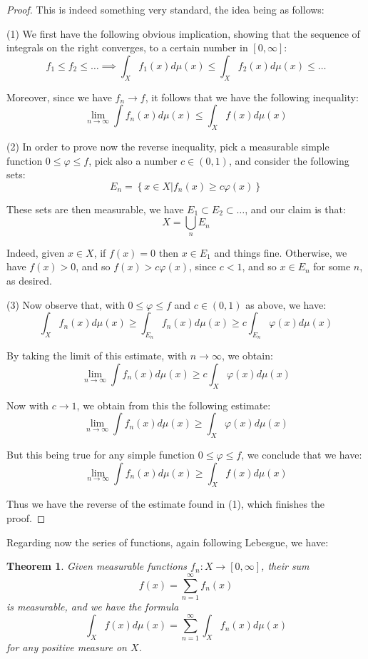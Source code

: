 \documentclass[12pt]{amsbook}
\newtheorem{theorem}{Theorem}[chapter]
\begin{document}
\begin{proof}
This is indeed something very standard, the idea being as follows:

\medskip

(1) We first have the following obvious implication, showing that the sequence of integrals on the right converges, to a certain number in $[0,\infty]$: 
$$f_1\leq f_2\leq\ldots\implies\int_Xf_1(x)d\mu(x)\leq\int_Xf_2(x)d\mu(x)\leq\ldots$$

Moreover, since we have $f_n\to f$, it follows that we have the following inequality:
$$\lim_{n\to\infty}\int f_n(x)d\mu(x)\leq\int_Xf(x)d\mu(x)$$

(2) In order to prove now the reverse inequality, pick a measurable simple function $0\leq\varphi\leq f$, pick also a number $c\in(0,1)$, and consider the following sets:
$$E_n=\left\{x\in X\Big|f_n(x)\geq c\varphi(x)\right\}$$

These sets are then measurable, we have $E_1\subset E_2\subset\ldots$, and our claim is that:
$$X=\bigcup_nE_n$$

Indeed, given $x\in X$, if $f(x)=0$ then $x\in E_1$ and things fine. Otherwise, we have $f(x)>0$, and so $f(x)>c\varphi(x)$, since $c<1$, and so $x\in E_n$ for some $n$, as desired.

\medskip

(3) Now observe that, with $0\leq\varphi\leq f$ and $c\in(0,1)$ as above, we have:
$$\int_Xf_n(x)d\mu(x)\geq\int_{E_n}f_n(x)d\mu(x)\geq c\int_{E_n}\varphi(x)d\mu(x)$$

By taking the limit of this estimate, with $n\to\infty$, we obtain:
$$\lim_{n\to\infty}\int f_n(x)d\mu(x)\geq c\int_X\varphi(x)d\mu(x)$$

Now with $c\to1$, we obtain from this the following estimate:
$$\lim_{n\to\infty}\int f_n(x)d\mu(x)\geq\int_X\varphi(x)d\mu(x)$$

But this being true for any simple function $0\leq\varphi\leq f$, we conclude that we have:
$$\lim_{n\to\infty}\int f_n(x)d\mu(x)\geq\int_X f(x)d\mu(x)$$

Thus we have the reverse of the estimate found in (1), which finishes the proof.
\end{proof}

Regarding now the series of functions, again following Lebesgue, we have:

\begin{theorem}
Given measurable functions $f_n:X\to[0,\infty]$, their sum 
$$f(x)=\sum_{n=1}^\infty f_n(x)$$
is measurable, and we have the formula
$$\int_Xf(x)d\mu(x)=\sum_{n=1}^\infty\int_Xf_n(x)d\mu(x)$$
for any positive measure on $X$.
\end{theorem}
\end{document}
